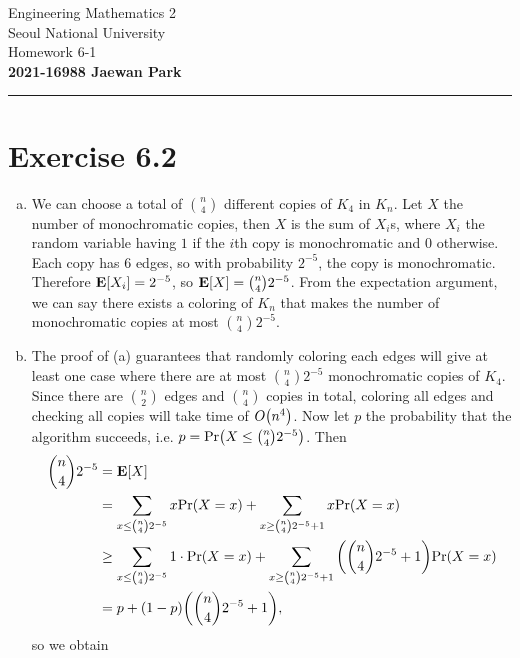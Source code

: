 \documentclass{article}
\begin{document}
\vspace*{-1.5cm}
{\centering \vbox{%
\vspace{2mm}
\large
Engineering Mathematics 2 \hfill
\\
Seoul National University
\\[4mm]
Homework 6-1\\
\textbf{2021-16988 Jaewan Park} \\[0.8mm]
}}
\par\noindent\rule{\textwidth}{0.5pt}

\section*{Exercise 6.2}
\begin{enumerate}[(a)]
    \item We can choose a total of ${n \choose 4}$ different copies of $K_4$ in $K_n$. 
    Let $X$ the number of monochromatic copies, then $X$ is the sum of $X_i$s, where $X_i$ the random variable having $1$ if the $i$th copy is monochromatic and $0$ otherwise.
    Each copy has $6$ edges, so with probability $2^{-5}$, the copy is monochromatic.
    Therefore $\mathbf{E}\qty[X_i] = 2^{-5}$, so $\mathbf{E}\qty[X] = {n \choose 4}2^{-5}$.
    From the expectation argument, we can say there exists a coloring of $K_n$ that makes the number of monochromatic copies at most ${n \choose 4}2^{-5}$.
    \item The proof of (a) guarantees that randomly coloring each edges will give at least one case where there are at most ${n \choose 4}2^{-5}$ monochromatic copies of $K_4$. 
    Since there are ${n \choose 2}$ edges and ${n \choose 4}$ copies in total, coloring all edges and checking all copies will take time of $O\qty(n^4)$.
    Now let $p$ the probability that the algorithm succeeds, i.e. $p = \mathrm{Pr}\qty(X \leq {n \choose 4}2^{-5})$.
    Then
    \begin{align*}
        {n \choose 4}2^{-5} &= \mathbf{E}\qty[X] \\
        &= \sum_{x \leq {n \choose 4}2^{-5}}x\mathrm{Pr}\qty(X = x) + \sum_{x \geq {n \choose 4}2^{-5} + 1}x\mathrm{Pr}\qty(X = x) \\
        &\geq \sum_{x \leq {n \choose 4}2^{-5}}1\cdot\mathrm{Pr}\qty(X = x) + \sum_{x \geq {n \choose 4}2^{-5} + 1}\qty({n \choose 4}2^{-5} + 1)\mathrm{Pr}\qty(X = x) \\
        &= p + (1-p)\qty({n \choose 4}2^{-5} + 1),
    \end{align*}
    so we obtain 

\end{enumerate}
\end{document}
